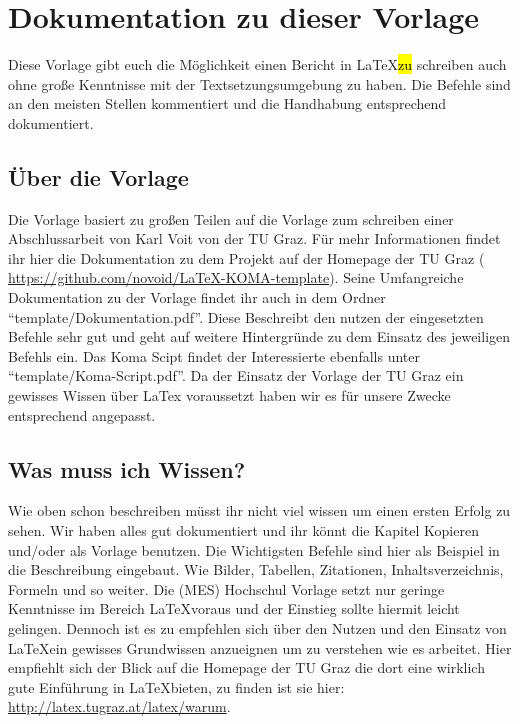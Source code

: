 \chapter{Dokumentation zu dieser Vorlage} %
\label{chap:Documentation}	%

Diese Vorlage gibt euch die Möglichkeit einen Bericht in \LaTeX \hl{zu} schreiben auch ohne große Kenntnisse mit der Textsetzungsumgebung zu haben. Die Befehle sind an den meisten Stellen kommentiert und die Handhabung entsprechend dokumentiert. 

\section{Über die Vorlage} %
\label{sec:WoKommtDasTempHer}

Die Vorlage basiert zu großen Teilen auf die Vorlage zum schreiben einer Abschlussarbeit von Karl Voit von der TU Graz. Für mehr Informationen findet ihr hier die Dokumentation zu dem Projekt auf der Homepage der TU Graz (
\href{https://github.com/novoid/LaTeX-KOMA-template}{https://github.com/novoid/LaTeX-KOMA-template}). %
Seine Umfangreiche Dokumentation zu der Vorlage findet ihr auch in dem Ordner \enquote{template/Dokumentation.pdf}. Diese Beschreibt den nutzen der eingesetzten Befehle sehr gut und geht auf weitere Hintergründe zu dem Einsatz  des jeweiligen Befehls ein. Das Koma Scipt findet der Interessierte ebenfalls unter \enquote{template/Koma-Script.pdf}. Da der Einsatz der Vorlage der TU Graz ein gewisses Wissen über LaTex voraussetzt haben wir es für unsere Zwecke entsprechend angepasst.


\section{Was muss ich Wissen?}
\label{sec:WasMussIchWissen}

Wie oben schon beschreiben müsst ihr nicht viel wissen um einen ersten Erfolg zu sehen. Wir haben alles gut dokumentiert und ihr könnt die Kapitel Kopieren und/oder als Vorlage benutzen. Die Wichtigsten Befehle sind hier als Beispiel in die Beschreibung eingebaut. Wie Bilder, Tabellen, Zitationen, Inhaltsverzeichnis, Formeln und so weiter. 
Die  %
(MES) Hochschul Vorlage setzt nur geringe Kenntnisse im Bereich \LaTeX voraus und der Einstieg sollte hiermit leicht gelingen. Dennoch ist es zu empfehlen sich über den Nutzen und den Einsatz von \LaTeX ein gewisses Grundwissen anzueignen um zu verstehen wie es arbeitet. Hier empfiehlt sich der Blick auf die Homepage der TU Graz die dort eine wirklich gute Einführung in \LaTeX bieten, zu finden ist sie hier: \linebreak \href{http://latex.tugraz.at/latex/warum}{http://latex.tugraz.at/latex/warum}. 

